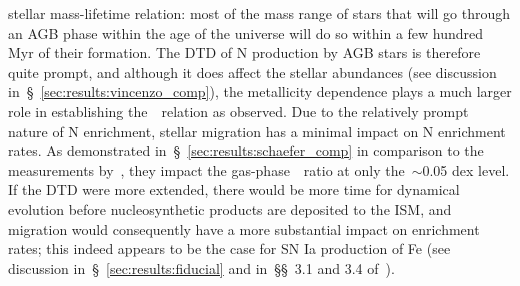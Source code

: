 \documentclass[ms.tex]{subfiles}
\begin{document}
stellar mass-lifetime relation: most of the mass range of stars that will go
through an AGB phase within the age of the universe will do so within a few
hundred Myr of their formation.
The DTD of N production by AGB stars is therefore quite prompt, and although it
does affect the stellar abundances (see discussion
in~\S~\ref{sec:results:vincenzo_comp}), the metallicity dependence plays a much
larger role in establishing the~\ohno~relation as observed.
Due to the relatively prompt nature of N enrichment, stellar migration has a
minimal impact on N enrichment rates.
As demonstrated in~\S~\ref{sec:results:schaefer_comp} in comparison to the
measurements by~\citet{Schaefer2020}, they impact the gas-phase~\no~ratio at
only the~$\sim$0.05 dex level.
If the DTD were more extended, there would be more time for dynamical evolution
before nucleosynthetic products are deposited to the ISM, and migration would
consequently have a more substantial impact on enrichment rates; this indeed
appears to be the case for SN Ia production of Fe (see discussion
in~\S~\ref{sec:results:fiducial} and in~\S\S~3.1 and 3.4
of~\citealp{Johnson2021}).
\par
\end{document}
